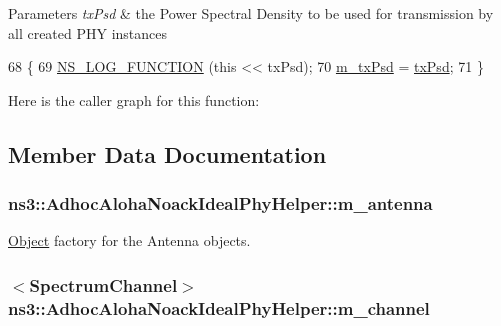 \begin{DoxyParams}{Parameters}
{\em tx\+Psd} & the Power Spectral Density to be used for transmission by all created P\+HY instances \\
\hline
\end{DoxyParams}

\begin{DoxyCode}
68 \{
69   \hyperlink{log-macros-disabled_8h_a90b90d5bad1f39cb1b64923ea94c0761}{NS\_LOG\_FUNCTION} (\textcolor{keyword}{this} << txPsd);
70   \hyperlink{classns3_1_1AdhocAlohaNoackIdealPhyHelper_a684be03c1600fd53054a8654aa3c516b}{m\_txPsd} = \hyperlink{lte__link__budget_8m_a684fe3101a5e48a5fcc57cab8dbcd1aa}{txPsd};
71 \}
\end{DoxyCode}


Here is the caller graph for this function\+:




\subsection{Member Data Documentation}
\subsubsection[{\texorpdfstring{m\+\_\+antenna}{m_antenna}}]{ ns3\+::\+Adhoc\+Aloha\+Noack\+Ideal\+Phy\+Helper\+::m\+\_\+antenna\hspace{0.3cm}{\ttfamily [protected]}}\hypertarget{classns3_1_1AdhocAlohaNoackIdealPhyHelper_a932538c358299d313ca1b15348df6ea0}{}\label{classns3_1_1AdhocAlohaNoackIdealPhyHelper_a932538c358299d313ca1b15348df6ea0}


\hyperlink{classns3_1_1Object}{Object} factory for the Antenna objects. 

\subsubsection[{\texorpdfstring{m\+\_\+channel}{m_channel}}]{$<${\bf Spectrum\+Channel}$>$ ns3\+::\+Adhoc\+Aloha\+Noack\+Ideal\+Phy\+Helper\+::m\+\_\+channel\hspace{0.3cm}{\ttfamily [protected]}}\hypertarget{classns3_1_1AdhocAlohaNoackIdealPhyHelper_a3cd17acf9ec7f241a773ecf15482f128}{}\label{classns3_1_1AdhocAlohaNoackIdealPhyHelper_a3cd17acf9ec7f241a773ecf15482f128}


